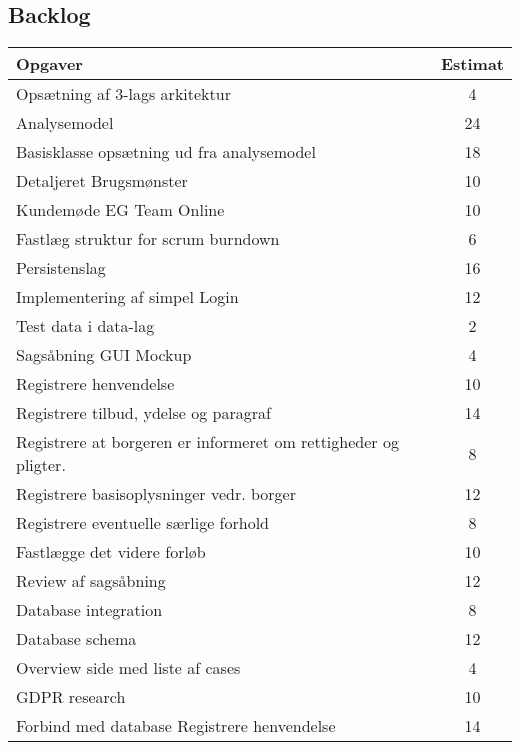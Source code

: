 \documentclass[../main.tex]{subfiles}
\begin{document}
\subsection{Backlog}

\begin{center}
   \small
   \begin{longtable}{| l | c |}
    \hline
    \textbf{Opgaver}												 & \textbf{Estimat} \\ \hline
    Opsætning af 3-lags arkitektur									 & 4  \\ \hline
    Analysemodel													 & 24 \\ \hline
    Basisklasse opsætning ud fra analysemodel						 & 18 \\ \hline
    Detaljeret Brugsmønster											 & 10 \\ \hline
    Kundemøde EG Team Online										 & 10 \\ \hline
    Fastlæg struktur for scrum burndown								 & 6  \\ \hline
    Persistenslag							 	 					 & 16 \\ \hline
    Implementering af simpel Login									 & 12 \\ \hline
    Test data i data-lag 							                 & 2  \\ \hline
    Sagsåbning GUI Mockup										     & 4  \\ \hline
    Registrere henvendelse    										 & 10 \\ \hline
    Registrere tilbud, ydelse og paragraf   						 & 14 \\ \hline
    Registrere at borgeren er informeret om rettigheder og pligter.  & 8  \\ \hline
    Registrere basisoplysninger vedr. borger  						 & 12 \\ \hline
    Registrere eventuelle særlige forhold    						 & 8  \\ \hline
    Fastlægge det videre forløb 									 & 10 \\ \hline
    Review af sagsåbning										 	 & 12 \\ \hline
    Database integration									         & 8  \\ \hline
    Database schema									                 & 12 \\ \hline
    Overview side med liste af cases								 & 4  \\ \hline
    GDPR research													 & 10 \\ \hline
    Forbind med database Registrere henvendelse    				     & 14 \\ \hline

\end{longtable}
\end{center}
\end{document}
